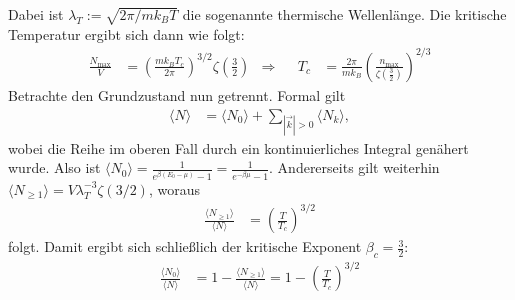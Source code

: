 \documentclass[a4paper,12pt]{article}
\newcommand{\bra}{}
\newcommand{\kla}{}
\newcommand{\tecxt}{}
\begin{document}
Dabei ist $\lambda_T:=\sqrt{2\pi /mk_BT}$ die sogenannte thermische Wellenlänge. Die kritische Temperatur ergibt sich dann wie folgt:
\begin{align*}
\frac{N_\tecxt\text{max}}{V}&=\kla\left( {\frac{mk_BT_c}{2\pi}} \right)^{3/2}\zeta\kla\left( {\frac{3}{2}} \right)&\Rightarrow &&T_c&=\frac{2\pi}{mk_B}\kla\left( {\frac{n_\tecxt\text{max}}{\zeta\kla\left( {\frac{3}{2}} \right)}} \right)^{2/3}
\end{align*}
Betrachte den Grundzustand nun getrennt. Formal gilt
\begin{align*}
\bra\langle {N}\rangle&=\bra\langle {N_0}\rangle+\sum_{|\vec{k}|>0}\bra\langle {N_k}\rangle,
\end{align*}
wobei die Reihe im oberen Fall durch ein kontinuierliches Integral genähert wurde. Also ist $\bra\langle {N_0}\rangle=\frac{1}{e^{\beta (E_0-\mu)}-1}=\frac{1}{e^{-\beta\mu}-1}$. Andererseits gilt weiterhin $\bra\langle {N_{\ge 1}}\rangle=V\lambda_T^{-3}\zeta (3/2)$, woraus 
\begin{align*}
\frac{\bra\langle {N_{\ge 1}}\rangle}{\bra\langle {N}\rangle}&=\kla\left( {\frac{T}{T_c}} \right)^{3/2}
\end{align*}
folgt. Damit ergibt sich schließlich der kritische Exponent $\beta_c=\frac{3}{2}$:
\begin{align*}
\frac{\bra\langle {N_0}\rangle}{\bra\langle {N}\rangle}&=1-\frac{\bra\langle {N_{\ge 1}}\rangle}{\bra\langle {N}\rangle}=1-\kla\left( {\frac{T}{T_c}} \right)^{3/2}
\end{align*}
\end{document}
